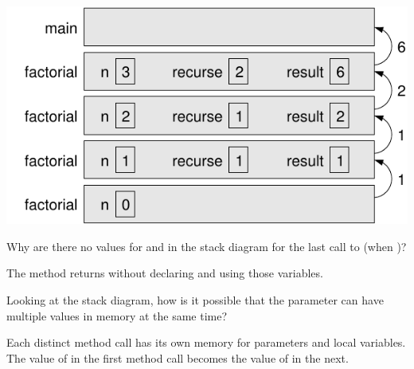 \vspace{1em}
\begin{minipage}{0.48\linewidth}

\includegraphics[width=\linewidth]{stack3.pdf}

\end{minipage}
\hfill
\begin{minipage}{0.48\linewidth}


\end{minipage}
\vspace{1em}


\Q Why are there no values for  and  in the stack diagram for the last call to  (when )?

\begin{answer}
The method returns without declaring and using those variables.
\end{answer}


\Q Looking at the stack diagram, how is it possible that the parameter  can have multiple values in memory at the same time?

\begin{answer}
Each distinct method call has its own memory for parameters and local variables.
The value of  in the first method call becomes the value of  in the next.
\end{answer}
